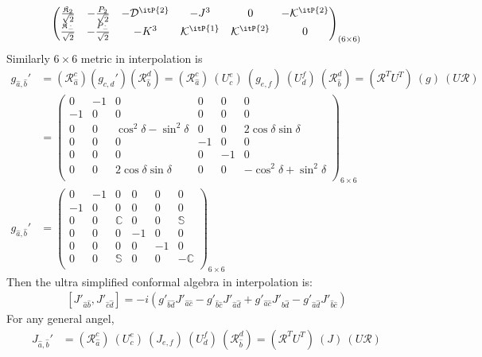 \documentclass[]{article}
\numberwithin{equation}{section}
\begin{document}
{{\begin{align}
\begin{pmatrix}
    \frac{\mathfrak{K}_2}{\sqrt{2}}&-\frac{P_{2}}{\sqrt{2}}&-{\mathcal{D}}^{\itP{2}} & -{J}^{3} & 0 & -{\mathcal{K}}^{\itP{2}}\\
    \frac{\mathfrak{K}_{\hat{-}}}{\sqrt{2}}&-\frac{P_{\hat{-}}}{\sqrt{2}}&-{K}^{3} & {\mathcal{K}}^{\itP{1}} & {\mathcal{K}}^{\itP{2}} & 0
  \end{pmatrix}_{(6\times6)}
\end{align}
Similarly $6\times6$ metric in interpolation is
\begin{align}
    g_{\hat{a},\hat{b}}'&=(\mathcal{R}_{\hat{a}}^{{c}})(g_{c,d}')(\mathcal{R}_{\hat{b}}^{{d}})=(\mathcal{R}_{\hat{a}}^{{c}})~(U_{c}^{e})~(g_{e,f})~(U_{d}^{f})~(\mathcal{R}_{\hat{b}}^{{d}})=(\mathcal{R}^TU^T)~(g)~(U\mathcal{R})\\
    &=\begin{pmatrix}
  0&-1&0&0&0&0\\
  -1&0&0&0&0&0\\
  0&0&\cos^2{\delta}-\sin^2{\delta}&0&0&2\cos{\delta}\sin{\delta}\\
  0&0&0&-1&0&0\\
  0&0&0&0&-1&0\\
  0&0&2\cos{\delta}\sin{\delta}&0&0&-\cos^2{\delta}+\sin^2{\delta}\\
  \end{pmatrix}_{6\times6}\\
  g_{\hat{a},\hat{b}}'&=\begin{pmatrix}
  0&-1&0&0&0&0\\
  -1&0&0&0&0&0\\
  0&0&\mathbb{C}&0&0&\mathbb{S}\\
  0&0&0&-1&0&0\\
  0&0&0&0&-1&0\\
  0&0&\mathbb{S}&0&0&-\mathbb{C}\\
  \end{pmatrix}_{6\times6}
\end{align}
Then the ultra simplified conformal algebra in interpolation is:
  \begin{align}
      \boxed{\left[J'_{{\hat{a}}{\hat{b}}},J'_{{\hat{c}}{\hat{d}}}\right]=-i\left(g'_{{\hat{b}}{\hat{d}}}J'_{{\hat{a}}{\hat{c}}}-g'_{{\hat{b}}{\hat{c}}}J'_{{\hat{a}}{\hat{d}}}+g'_{{\hat{a}}{\hat{c}}}J'_{{\hat{b}}{\hat{d}}}-g'_{{\hat{a}}{\hat{d}}}J'_{{\hat{b}}{\hat{c}}}\right)}
  \end{align}
  For any general angel,
  \begin{align}
      J_{\hat{a},\hat{b}}'&=(\mathcal{R}_{\hat{a}}^{{c}})~(U_{c}^{e})~(J_{e,f})~(U_{d}^{f})~(\mathcal{R}_{\hat{b}}^{{d}})=(\mathcal{R}^TU^T)~(J)~(U\mathcal{R})\\

\end{align}}}
\end{document}

